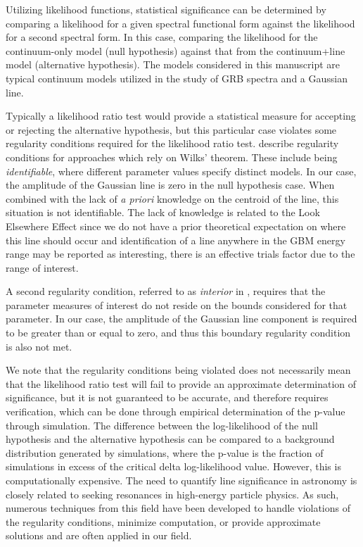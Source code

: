 \documentclass{aastex61}
\begin{document}
Utilizing likelihood functions, statistical significance can be determined by comparing a likelihood for a given spectral functional form against the likelihood for a second spectral form. In this case, comparing the likelihood for the continuum-only model (null hypothesis) against that from the continuum+line model (alternative hypothesis). The models considered in this manuscript are typical continuum models utilized in the study of GRB spectra and a Gaussian line. 

Typically a likelihood ratio test would provide a statistical measure for accepting or rejecting the alternative hypothesis, but this particular case violates some regularity conditions required for the likelihood ratio test\citep[e.g.][]{protassov2002statistics}. \citet{algeri2019searching} describe regularity conditions for approaches which rely on Wilks' theorem. These include being \textit{identifiable}, where different parameter values specify distinct models. In our case, the amplitude of the Gaussian line is zero in the null hypothesis case. When combined with the lack of {\it a priori} knowledge on the centroid of the line, this situation is not identifiable. The lack of knowledge is related to the Look Elsewhere Effect since we do not have a prior theoretical expectation on where this line should occur and identification of a line anywhere in the GBM energy range may be reported as interesting, there is an effective trials factor due to the range of interest. 

A second regularity condition, referred to as \textit{interior} in \citet{algeri2019searching}, requires that the parameter measures of interest do not reside on the bounds considered for that parameter. In our case, the amplitude of the Gaussian line component is required to be greater than or equal to zero, and thus this boundary regularity condition is also not met.

We note that the regularity conditions being violated does not necessarily mean that the likelihood ratio test will fail to provide an approximate determination of significance, but it is not guaranteed to be accurate, and therefore requires verification, which can be done through empirical determination of the p-value through simulation. The difference between the log-likelihood of the null hypothesis and the alternative hypothesis can be compared to a background distribution generated by simulations, where the p-value is the fraction of simulations in excess of the critical delta log-likelihood value. However, this is computationally expensive. The need to quantify line significance in astronomy is closely related to seeking resonances in high-energy particle physics. As such, numerous techniques from this field have been developed to handle violations of the regularity conditions, minimize computation, or provide approximate solutions and are often applied in our field. 
\end{document}
